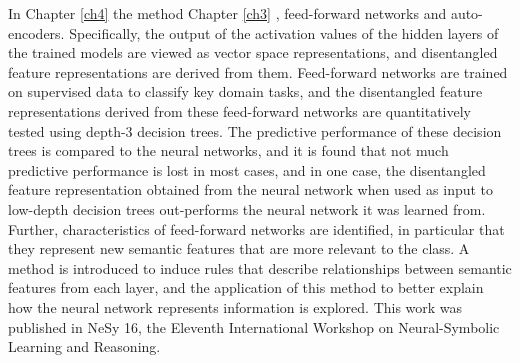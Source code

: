 In Chapter \ref{ch4}\hmark{,} the method  Chapter \ref{ch3} ,  feed-forward networks and auto-encoders. Specifically, the output of the activation values of the hidden layers  of the trained models are viewed as vector space representations,  and  disentangled feature representations are derived from them. Feed-forward networks are trained on supervised data to classify key domain tasks, and the disentangled feature representations derived from these feed-forward networks are quantitatively tested using depth-3 decision trees. The predictive performance of these decision trees is compared to the neural networks, and it is found that not much predictive performance is lost in most cases, and in one case, the disentangled feature representation obtained from the neural network when used as input to low-depth decision trees  out-performs the neural network it was learned from.  Further, characteristics of feed-forward networks are identified, in particular that they represent new semantic features that are more relevant to the class.   A method is introduced to induce rules that describe relationships between semantic features from each layer, and the application of this method to  better explain how the neural network represents information is explored. This work was published in NeSy 16, the Eleventh International Workshop on Neural-Symbolic Learning and Reasoning.





